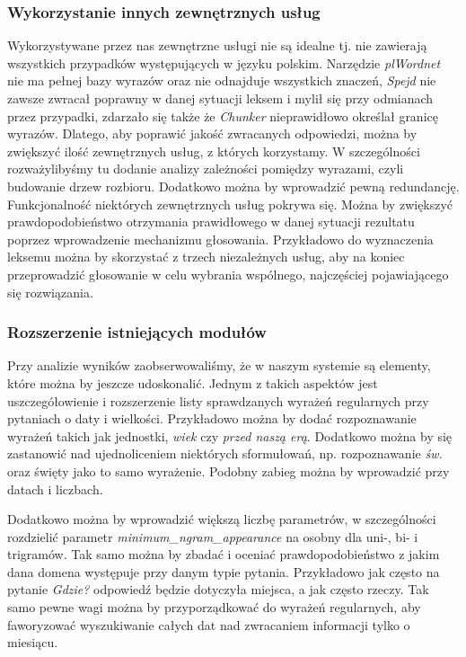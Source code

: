 \subsubsection{Wykorzystanie innych zewnętrznych usług}
Wykorzystywane przez nas zewnętrzne usługi nie są idealne tj. nie zawierają wszystkich przypadków występujących w języku polskim. Narzędzie \emph{plWordnet} nie ma pełnej bazy wyrazów oraz nie odnajduje wszystkich znaczeń, \emph{Spejd} nie zawsze zwracał poprawny w danej sytuacji leksem i mylił się przy odmianach przez przypadki, zdarzało się także że \emph{Chunker} nieprawidłowo określał granicę wyrazów. Dlatego, aby poprawić jakość zwracanych odpowiedzi, można by zwiększyć ilość zewnętrznych usług, z których korzystamy. W szczególności rozważylibyśmy tu dodanie analizy zależności pomiędzy wyrazami, czyli budowanie drzew rozbioru. Dodatkowo można by wprowadzić pewną redundancję. Funkcjonalność niektórych zewnętrznych usług pokrywa się. Można by zwiększyć prawdopodobieństwo otrzymania prawidłowego w danej sytuacji rezultatu poprzez wprowadzenie mechanizmu głosowania. Przykładowo do wyznaczenia leksemu można by skorzystać z trzech niezależnych usług, aby na koniec przeprowadzić głosowanie w celu wybrania wspólnego, najczęściej pojawiającego się rozwiązania. 

\subsubsection{Rozszerzenie istniejących modułów}
Przy analizie wyników zaobserwowaliśmy, że w naszym systemie są elementy, które można by jeszcze udoskonalić. Jednym z takich aspektów jest uszczegółowienie i rozszerzenie listy sprawdzanych wyrażeń regularnych przy pytaniach o daty i wielkości. Przykładowo można by dodać rozpoznawanie wyrażeń takich jak jednostki, \emph{wiek} czy \emph{przed naszą erą}. Dodatkowo można by się zastanowić nad ujednoliceniem niektórych sformułowań, np. rozpoznawanie \emph{św.} oraz święty jako to samo wyrażenie. Podobny zabieg można by wprowadzić przy datach i liczbach. 

Dodatkowo można by wprowadzić większą liczbę parametrów, w szczególności rozdzielić parametr \emph{minimum\_ngram\_appearance} na osobny dla uni-, bi- i trigramów. Tak samo można by zbadać i oceniać prawdopodobieństwo z jakim dana domena występuje przy danym typie pytania. Przykładowo jak często na pytanie \emph{Gdzie?} odpowiedź będzie dotyczyła miejsca, a jak często rzeczy. Tak samo pewne wagi można by przyporządkować do wyrażeń regularnych, aby faworyzować wyszukiwanie całych dat nad zwracaniem informacji tylko o miesiącu. 

